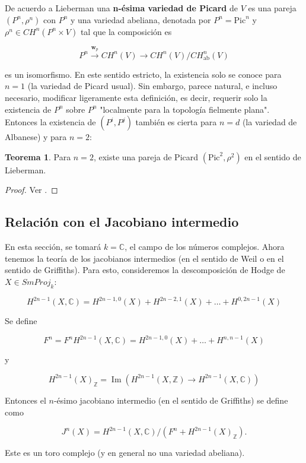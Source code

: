\documentclass[10pt]{amsart}
\theoremstyle{definition}
\newtheorem{theorem}[definition]{Teorema}
\theoremstyle{remark}
\theoremstyle{definition}
\begin{document}
De acuerdo a Lieberman una \textbf{n-ésima variedad de Picard} de $V$ es una pareja $(P^{n},\rho^{n})$ con $P^{n}$ y una variedad abeliana, denotada por $P^{n}=\mathrm{Pic}^{n}$ y $\rho^{n} \in CH^{n}(P^{n} \times V)$ tal que la composición es 

\[P^n \xrightarrow{\mathbf{w}_p} CH^n(V) \xrightarrow{} CH^n(V)/CH^{n}_{\text{ab}}(V)\]

es un isomorfismo.  En este sentido estricto, la existencia solo se conoce para $n=1$ (la variedad de Picard usual). Sin embargo, parece natural, e incluso necesario, modificar ligeramente esta definición, es decir, requerir solo la existencia de $P^n$ sobre $P^n$ "localmente para la topología fielmente plana". Entonces la existencia de $(P^i, P^j)$ también es cierta para $n=d$ (la variedad de Albanese) y para $n=2$:

\begin{theorem}
Para $n=2$, existe una pareja de Picard $(\mathrm{Pic}^{2},\rho^{2})$ en el sentido de Lieberman.
 \end {theorem}

\begin{proof}
Ver \cite[Thm. 1.10.1]{Mur85}.
\end{proof}

\subsection{Relación con el Jacobiano intermedio}

En esta sección, se tomará $k=\mathbb{C}$, el campo de los números complejos. Ahora tenemos la teoría de los jacobianos intermedios (en el sentido de Weil o en el sentido de Griffiths). Para esto, consideremos la descomposición de Hodge de $X\in SmProj_{k}$:

\[
H^{2n-1}(X, \mathbb{C}) = H^{2n-1,0}(X) + H^{2n-2,1}(X) + \ldots + H^{0,2n-1}(X)
\]

Se define

\[
F^n = F^nH^{2n-1}(X, \mathbb{C}) = H^{2n-1,0}(X) + \ldots + H^{n,n-1}(X)
\]

y

\[
H^{2n-1}(X)_{\mathbb{Z}} = \operatorname{Im}(H^{2n-1}(X, \mathbb{Z}) \longrightarrow H^{2n-1}(X, \mathbb{C}))
\]

Entonces el $n$-ésimo jacobiano intermedio (en el sentido de Griffiths) se define como

\[
J^n(X) = H^{2n-1}(X, \mathbb{C})/(F^n+H^{2n-1}(X)_{\mathbb{Z}}).
\]

Este es un toro complejo (y en general no una variedad abeliana).
\end{document}
